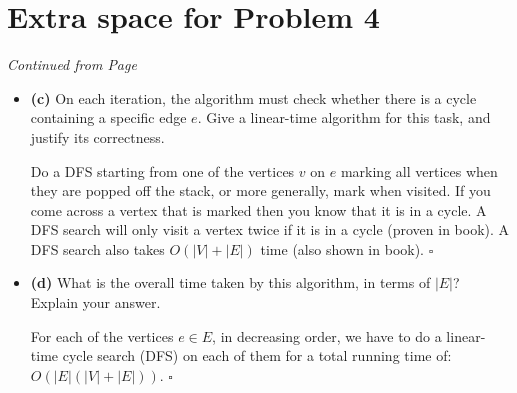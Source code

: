 \documentclass[11pt]{article}
\begin{document}

\label{pg:p2-continuation}
\newpage







\section*{Extra space for Problem 4}
\emph{Continued from Page \pageref{pg:end-of-p4}}\\

\begin{itemize}
\item[] {\bf (c)} On each iteration, the algorithm must check whether there is a cycle containing a specific edge $e$. Give a linear-time algorithm for this task, and justify its correctness.

Do a DFS starting from one of the vertices $v$ on $e$ marking all vertices when they are popped off the stack, or more generally, mark when visited. If you come across a vertex that is marked then you know that it is in a cycle. A DFS search will only visit a vertex twice if it is in a cycle (proven in book). A DFS search also takes $O(|V| + |E|)$
 time (also shown in book). $\square$

 \item[] {\bf (d)} What is the overall time taken by this algorithm, in terms of $|E|$? Explain your answer. 

For each of the vertices $e\in E$, in decreasing order, we have to do a linear-time cycle search (DFS) on each of them for a total running time of: $O(|E|(|V|+|E|))$. $\square$
\end{itemize}

\label{pg:p4-continuation}
\newpage
\end{document}
